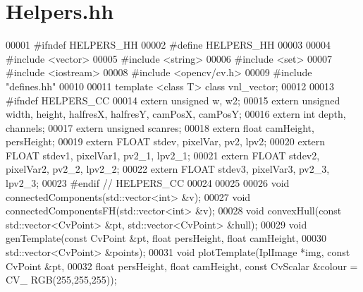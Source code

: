 \hypertarget{Helpers_8hh_source}{
\section{Helpers.hh}
}

\begin{DoxyCode}
00001 \textcolor{preprocessor}{#ifndef HELPERS\_HH}
00002 \textcolor{preprocessor}{}\textcolor{preprocessor}{#define HELPERS\_HH}
00003 \textcolor{preprocessor}{}
00004 \textcolor{preprocessor}{#include <vector>}
00005 \textcolor{preprocessor}{#include <string>}
00006 \textcolor{preprocessor}{#include <set>}
00007 \textcolor{preprocessor}{#include <iostream>}
00008 \textcolor{preprocessor}{#include <opencv/cv.h>}
00009 \textcolor{preprocessor}{#include "defines.hh"}
00010 
00011 \textcolor{keyword}{template} <\textcolor{keyword}{class} T> \textcolor{keyword}{class }vnl\_vector;
00012 
00013 \textcolor{preprocessor}{#ifndef HELPERS\_CC}
00014 \textcolor{preprocessor}{}\textcolor{keyword}{extern} \textcolor{keywordtype}{unsigned} w, w2;
00015 \textcolor{keyword}{extern} \textcolor{keywordtype}{unsigned} width, height, halfresX, halfresY, camPosX, camPosY;
00016 \textcolor{keyword}{extern} \textcolor{keywordtype}{int} depth, channels;
00017 \textcolor{keyword}{extern} \textcolor{keywordtype}{unsigned} scanres;
00018 \textcolor{keyword}{extern} \textcolor{keywordtype}{float} camHeight, persHeight;
00019 \textcolor{keyword}{extern} FLOAT stdev, pixelVar, pv2, lpv2;
00020 \textcolor{keyword}{extern} FLOAT stdev1, pixelVar1, pv2\_1, lpv2\_1;
00021 \textcolor{keyword}{extern} FLOAT stdev2, pixelVar2, pv2\_2, lpv2\_2;
00022 \textcolor{keyword}{extern} FLOAT stdev3, pixelVar3, pv2\_3, lpv2\_3;
00023 \textcolor{preprocessor}{#endif // HELPERS\_CC}
00024 \textcolor{preprocessor}{}
00025 
00026 \textcolor{keywordtype}{void} connectedComponents(std::vector<int> &v);
00027 \textcolor{keywordtype}{void} connectedComponentsFH(std::vector<int> &v);
00028 \textcolor{keywordtype}{void} convexHull(\textcolor{keyword}{const} std::vector<CvPoint> &pt, std::vector<CvPoint> &hull);
00029 \textcolor{keywordtype}{void} genTemplate(\textcolor{keyword}{const} CvPoint &pt, \textcolor{keywordtype}{float} persHeight, \textcolor{keywordtype}{float} camHeight,
00030                  std::vector<CvPoint> &points);
00031 \textcolor{keywordtype}{void} plotTemplate(IplImage *img, \textcolor{keyword}{const} CvPoint &pt,
00032                   \textcolor{keywordtype}{float} persHeight, \textcolor{keywordtype}{float} camHeight, \textcolor{keyword}{const} CvScalar &colour = CV\_
      RGB(255,255,255));

\end{DoxyCode}
